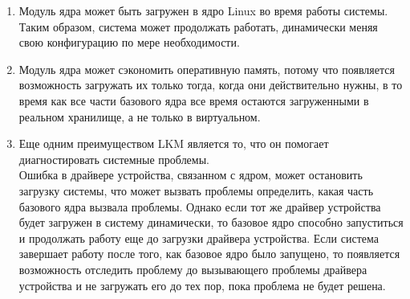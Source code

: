 \begin{enumerate}
    \item Модуль ядра может быть загружен в ядро Linux во время работы системы. \vspace{1mm}\\
    Таким образом, система может продолжать работать, динамически меняя свою конфигурацию по мере необходимости.
    \item Модуль ядра может сэкономить оперативную память,
    потому что появляется возможность загружать их только тогда, когда они действительно нужны, в то время как
    все части базового ядра все время остаются загруженными в реальном хранилище, а не только в виртуальном.
    \item Еще одним преимуществом LKM является то, что он помогает диагностировать системные проблемы. \vspace{1mm}\\
    Ошибка в драйвере устройства, связанном с ядром, может остановить загрузку системы, что может вызвать проблемы определить, какая часть базового ядра вызвала проблемы.
    Однако если тот же драйвер устройства будет загружен в систему динамически, то базовое ядро способно запуститься и продолжать работу еще до загрузки драйвера устройства.
    Если система завершает работу после того, как базовое ядро было запущено, то появляется возможность отследить проблему до вызывающего проблемы драйвера устройства и не загружать его до тех пор, пока проблема не будет решена.
\end{enumerate}

